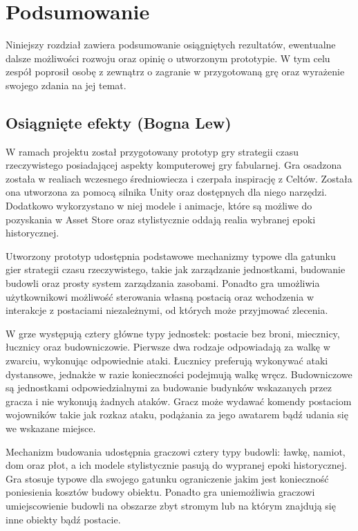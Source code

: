 \chapter{Podsumowanie}\label{chap:summary}
Niniejszy rozdział zawiera podsumowanie osiągniętych rezultatów, ewentualne dalsze możliwości rozwoju oraz opinię o
utworzonym prototypie. W tym celu zespół poprosił osobę z zewnątrz o zagranie w przygotowaną grę oraz wyrażenie swojego
zdania na jej temat.

\section{Osiągnięte efekty (Bogna Lew)}
W ramach projektu został przygotowany prototyp gry strategii czasu rzeczywistego posiadającej aspekty komputerowej gry
fabularnej. Gra osadzona została w realiach wczesnego średniowiecza i czerpała inspirację z Celtów. Została ona
utworzona za pomocą silnika Unity oraz dostępnych dla niego narzędzi. Dodatkowo wykorzystano w niej modele i animacje,
które są możliwe do pozyskania w Asset Store oraz stylistycznie oddają realia wybranej epoki historycznej.

Utworzony prototyp udostępnia podstawowe mechanizmy typowe dla gatunku gier strategii czasu rzeczywistego, takie jak
zarządzanie jednostkami, budowanie budowli oraz prosty system zarządzania zasobami. Ponadto gra umożliwia użytkownikowi
możliwość sterowania własną postacią oraz wchodzenia w interakcje z postaciami niezależnymi, od których może przyjmować
zlecenia.

W grze występują cztery główne typy jednostek: postacie bez broni, miecznicy, łucznicy oraz budowniczowie. Pierwsze dwa
rodzaje odpowiadają za walkę w zwarciu, wykonując odpowiednie ataki. Łucznicy preferują wykonywać ataki dystansowe,
jednakże w razie konieczności podejmują walkę wręcz. Budowniczowe są jednostkami odpowiedzialnymi za budowanie budynków
wskazanych przez gracza i nie wykonują żadnych ataków. Gracz może wydawać komendy postaciom wojowników takie jak rozkaz
ataku, podążania za jego awatarem bądź udania się we wskazane miejsce.

Mechanizm budowania udostępnia graczowi cztery typy budowli: ławkę, namiot, dom oraz płot, a ich modele stylistycznie
pasują do wypranej epoki historycznej. Gra stosuje typowe dla swojego gatunku ograniczenie jakim jest konieczność
poniesienia kosztów budowy obiektu. Ponadto gra uniemożliwia graczowi umiejscowienie budowli na obszarze zbyt stromym
lub na którym znajdują się inne obiekty bądź postacie.

